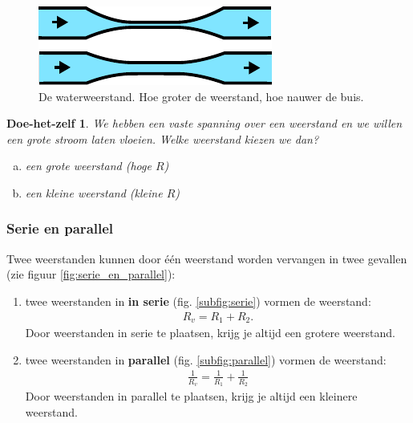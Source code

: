 \documentclass{article}
\newtheorem{DIY}{Doe-het-zelf}
\begin{document}
			\begin{figure}[htbp]
				\centering
				\includegraphics{waterweerstand}
				\caption{De waterweerstand. Hoe groter de weerstand, hoe nauwer de buis.}
				\label{fig:waterweerstand}
			\end{figure}
				\begin{DIY}
					We hebben een vaste spanning over een weerstand en we willen een grote stroom laten vloeien. Welke weerstand kiezen we dan?
					\begin{enumerate}[a)]
						\item een grote weerstand (hoge $R$)
						\item een kleine weerstand (kleine $R$)
					\end{enumerate}
				\end{DIY}

		\subsubsection{Serie en parallel}
			\label{sssec:serie_en_parallel}
			Twee weerstanden kunnen door \'e\'en  weerstand worden vervangen in twee gevallen (zie figuur \ref{fig:serie_en_parallel}):

			\begin{enumerate}
				\item twee weerstanden in \textbf{in serie} (fig. \ref{subfig:serie}) vormen de weerstand:
				\begin{align}
					R_{v} = R_1 + R_2.
				\end{align}
				Door weerstanden in serie te plaatsen, krijg je altijd een grotere weerstand.

				\item twee weerstanden in \textbf{parallel} (fig. \ref{subfig:parallel}) vormen de weerstand:
				\begin{align}
					\frac{1}{R_{v}}= \frac{1}{R_{1}} + \frac{1}{R_{2}} 
				\end{align}
				Door weerstanden in parallel te plaatsen, krijg je altijd een kleinere weerstand.
			\end{enumerate}
\end{document}
